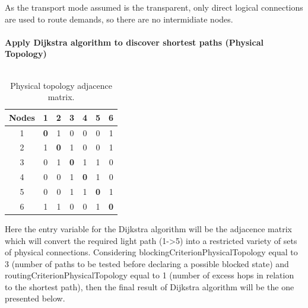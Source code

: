 As the transport mode assumed is the transparent, only direct logical connections are used to route demands, so there are no intermidiate nodes.\\ \\

\textbf{Apply Dijkstra algorithm to discover shortest paths (Physical Topology)}\\ \\
\begin{table}[H]
	\centering
	\begin{tabular}{|c|c|c|c|c|c|c|}
		\hline
		\textbf{Nodes} & 1 & 2 & 3 & 4 & 5 & 6 \\ \hline
		1     & \textbf{0} & 1 & 0 & 0 & 0 & 1 \\ \hline
		2     & 1 & \textbf{0} & 1 & 0 & 0 & 1 \\ \hline
		3     & 0 & 1 & \textbf{0} & 1 & 1 & 0 \\ \hline
		4     & 0 & 0 & 1 & \textbf{0} & 1 & 0 \\ \hline
		5     & 0 & 0 & 1 & 1 & \textbf{0} & 1 \\ \hline
		6     & 1 & 1 & 0 & 0 & 1 & \textbf{0} \\ \hline
	\end{tabular}
	\caption{Physical topology adjacence matrix.}
	\label{Adjacence_Matrix}
\end{table}
Here the entry variable for the Dijkstra algorithm will be the adjacence matrix which will convert the required light path (1->5) into a restricted variety of sets of physical connections. Considering blockingCriterionPhysicalTopology equal to 3 (number of paths to be tested before declaring a possible blocked state) and routingCriterionPhysicalTopology equal to 1 (number of excess hops in relation to the shortest path), then the final result of Dijkstra algorithm will be the one presented below.

